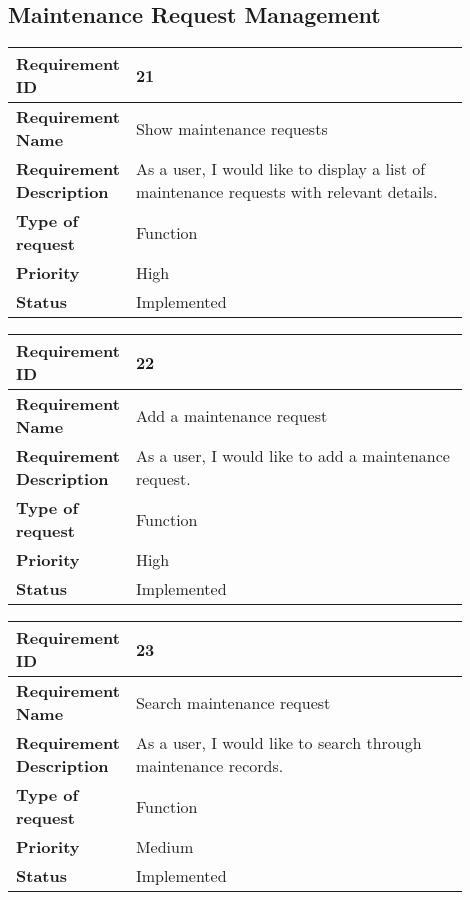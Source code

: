 \newpage
\subsection{Maintenance Request Management}
\begin{table}[htbp]
\centering
\begin{tabular}{|m{0.15\linewidth}|m{0.75\linewidth}|}
\hline
\textbf{Requirement ID} & 21 \\
\hline
\textbf{Requirement Name} & Show maintenance requests \\
\hline
\textbf{Requirement Description} & As a user, I would like to display a list of maintenance requests with relevant details. \\
\hline
\textbf{Type of request} & Function \\
\hline
\textbf{Priority} & High \\
\hline
\textbf{Status} & Implemented \\
\hline
\end{tabular}
\end{table}

\begin{table}[htbp]
\centering
\begin{tabular}{|m{0.15\linewidth}|m{0.75\linewidth}|}
\hline
\textbf{Requirement ID} & 22 \\
\hline
\textbf{Requirement Name} & Add a maintenance request \\
\hline
\textbf{Requirement Description} & As a user, I would like to add a maintenance request. \\
\hline
\textbf{Type of request} & Function \\
\hline
\textbf{Priority} & High \\
\hline
\textbf{Status} & Implemented \\
\hline
\end{tabular}
\end{table}

\begin{table}[htbp]
\centering
\begin{tabular}{|m{0.15\linewidth}|m{0.75\linewidth}|}
\hline
\textbf{Requirement ID} & 23 \\
\hline
\textbf{Requirement Name} & Search maintenance request \\
\hline
\textbf{Requirement Description} & As a user, I would like to search through maintenance records. \\
\hline
\textbf{Type of request} & Function \\
\hline
\textbf{Priority} & Medium \\
\hline
\textbf{Status} & Implemented \\
\hline
\end{tabular}
\end{table}

